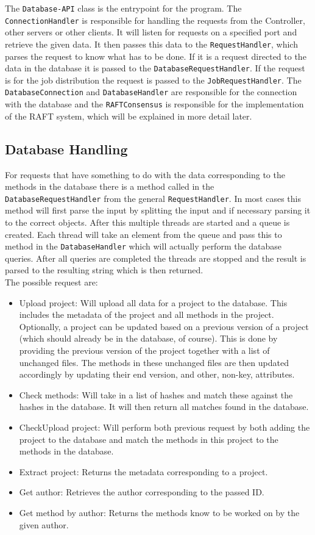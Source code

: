 \documentclass[../Main.tex]{subfiles}
\begin{document}
The \texttt{Database-API} class is the entrypoint for the program. The \texttt{ConnectionHandler} is responsible for handling the requests from the Controller, other servers or other clients. It will listen for requests on a specified port and retrieve the given data. It then passes this data to the \texttt{RequestHandler}, which parses the request to know what has to be done. If it is a request directed to the data in the database it is passed to the \texttt{DatabaseRequestHandler}. If the request is for the job distribution the request is passed to the \texttt{JobRequestHandler}. The \texttt{DatabaseConnection} and \texttt{DatabaseHandler} are responsible for the connection with the database and the \texttt{RAFTConsensus} is responsible for the implementation of the RAFT system, which will be explained in more detail later.

\subsection{Database Handling}
For requests that have something to do with the data corresponding to the methods in the database there is a method called in the \texttt{DatabaseRequestHandler} from the general \texttt{RequestHandler}. In most cases this method will first parse the input by splitting the input and if necessary parsing it to the correct objects. After this multiple threads are started and a queue is created. Each thread will take an element from the queue and pass this to method in the \texttt{DatabaseHandler} which will actually perform the database queries. After all queries are completed the threads are stopped and the result is parsed to the resulting string which is then returned.\\

The possible request are:
\begin{itemize}
    \item Upload project: Will upload all data for a project to the database. This includes the metadata of the project and all methods in the project. Optionally, a project can be updated based on a previous version of a project (which should already be in the database, of course). This is done by providing the previous version of the project together with a list of unchanged files. The methods in these unchanged files are then updated accordingly by updating their end version, and other, non-key, attributes.
    \item Check methods: Will take in a list of hashes and match these against the hashes in the database. It will then return all matches found in the database.
    \item CheckUpload project: Will perform both previous request by both adding the project to the database and match the methods in this project to the methods in the database.
    \item Extract project: Returns the metadata corresponding to a project.
    \item Get author: Retrieves the author corresponding to the passed ID.
    \item Get method by author: Returns the methods know to be worked on by the given author.
\end{itemize}
\end{document}

